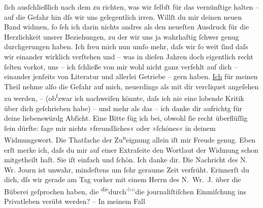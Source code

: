 \begin{ledgroupsized}[t]{13cm}
               ſich ausſchließlich nach dem zu richten, was wir ſelbſt für das vernünftige halten –
               auf die Gefahr hin dſs wir uns ge{\pb}legentlich irren.
               Willſt du mir deinen neuen
                  Band widmen, ſo ſeh ich darin nichts andres als den neueſten Ausdruck für die
               Herzlichkeit unsrer Beziehungen, zu der wir uns ja wahrhaftig ſchwer genug
               durchgerungen haben. Ich freu mich nun umſo mehr, daſs wir ſo weit ſind daſs wir
               einander wirklich verſtehen und – was in dieſen Jahren {\pb}doch eigentlich recht
               ſelten vorko{\geminationm}t, uns – ich ſchließe von mir wohl nicht
               ganz verfehlt auf dich – einander jenſeits von Literatur und allerlei Getriebe – gern
               haben. \uline{Ich} für meinen Theil nehme alſo die Gefahr auf
               mich, neuerdings als mit dir vercliquet angeſehen zu werden, \introOben{}–\introOben{} (ob\substVorne{}\textsuperscript{ſ}\substDazwischen{}z\substHinten{}war ich nachweiſen könnte, daſs ich nie eine lobende Kritik über dich
               geſchrieben habe) – und {\pb}mehr als das – ich danke dir aufrichtg für deine liebenswürdg Abſicht. Eine Bitte
               füg ich bei, obwohl ſie recht überflüſſig ſein dürfte: ſage mir nichts »freundliches«
               oder »ſchönes« in deinem Widmungswort. Die Thatſache der Zu\substVorne{}\textsuperscript{n}\substDazwischen{}ei\substHinten{}gnung allein iſt mir Freude genug.\pend
           \pstart
           Eben erſt merke ich, daſs du mir auf einer Extraſeite den Wortlaut der Widmung schon
               mitgetheilt haſt. Sie iſt einfach und ſchön. Ich danke dir.\pend
           \pstart
           {\pb}Die Nachricht des N. Wr. Journ ist unwahr, mindeſtens um ſehr
               geraume Zeit verfrüht. Erinnerſt du dich, dſs wir gerade am Tag vorher mit einem Herrn des N. Wr. J. über die Büberei geſprochen haben, die \substVorne{}\textsuperscript{die}\substDazwischen{}durch\substHinten{}{ }\substVorne{}\textsuperscript{\textcolor{gray}{den}}\substDazwischen{}die\substHinten{} journaliſtiſchen Einmiſchung ins Privatleben verübt werden? – In meinem Fall

\end{ledgroupsized}
